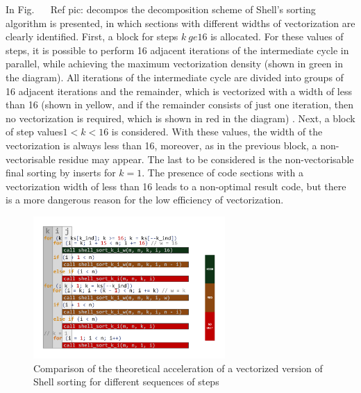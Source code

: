 \documentclass[
11pt,%
tightenlines,%
twoside,%
onecolumn,%
nofloats,%
nobibnotes,%
nofootinbib,%
superscriptaddress,%
noshowpacs,%
centertags]%
{revtex4}
\begin{document}
In Fig. ~ \ Ref {pic: decompos} the decomposition scheme of Shell's sorting algorithm is presented, in which sections with different widths of vectorization are clearly identified. First, a block for steps $ k \ ge 16 $ is allocated. For these values ​​of steps, it is possible to perform 16 adjacent iterations of the intermediate cycle in parallel, while achieving the maximum vectorization density (shown in green in the diagram). All iterations of the intermediate cycle are divided into groups of 16 adjacent iterations and the remainder, which is vectorized with a width of less than 16 (shown in yellow, and if the remainder consists of just one iteration, then no vectorization is required, which is shown in red in the diagram) . Next, a block of step values ​​$ 1 <k <16 $ is considered. With these values, the width of the vectorization is always less than 16, moreover, as in the previous block, a non-vectorisable residue may appear. The last to be considered is the non-vectorisable final sorting by inserts for $ k = 1 $. The presence of code sections with a vectorization width of less than 16 leads to a non-optimal result code, but there is a more dangerous reason for the low efficiency of vectorization.

\begin{figure}[h]
\setcaptionmargin{5mm}
\onelinecaptionstrue  %
\includegraphics[width=0.65\textwidth]{pics/pic_decomposition.pdf}
\caption{Comparison of the theoretical acceleration of a vectorized version of Shell sorting for different sequences of steps}\label{pic:decompos}
\end{figure}
\end{document}

